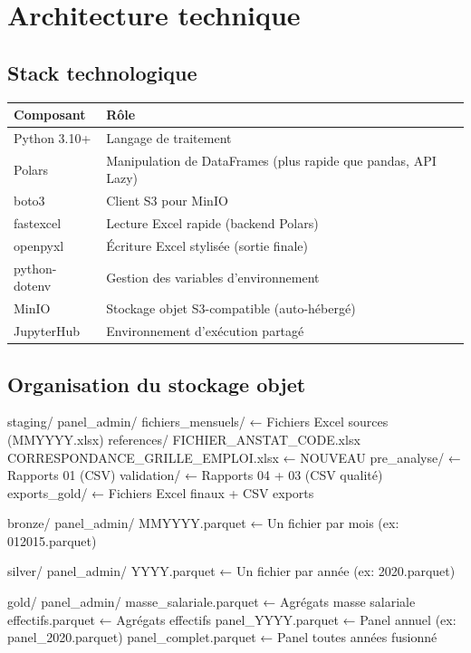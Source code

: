 \documentclass[12pt,a4paper,french]{report}
\begin{document}
\chapter{Architecture technique}

\section{Stack technologique}

\begin{tabularx}{\textwidth}{lX}
  \toprule
  \textbf{Composant} & \textbf{Rôle} \\
  \midrule
  Python 3.10+ & Langage de traitement \\
  Polars & Manipulation de DataFrames (plus rapide que pandas, API Lazy) \\
  boto3 & Client S3 pour MinIO \\
  fastexcel & Lecture Excel rapide (backend Polars) \\
  openpyxl & Écriture Excel stylisée (sortie finale) \\
  python-dotenv & Gestion des variables d'environnement \\
  MinIO & Stockage objet S3-compatible (auto-hébergé) \\
  JupyterHub & Environnement d'exécution partagé \\
  \bottomrule
\end{tabularx}

\section{Organisation du stockage objet}

\begin{codebox}
staging/
  panel\_admin/
    fichiers\_mensuels/       ← Fichiers Excel sources (MMYYYY.xlsx)
    references/
      FICHIER\_ANSTAT\_CODE.xlsx
      CORRESPONDANCE\_GRILLE\_EMPLOI.xlsx   ← NOUVEAU
    pre\_analyse/             ← Rapports 01 (CSV)
    validation/              ← Rapports 04 + 03 (CSV qualité)
    exports\_gold/            ← Fichiers Excel finaux + CSV exports

bronze/
  panel\_admin/
    MMYYYY.parquet            ← Un fichier par mois (ex: 012015.parquet)

silver/
  panel\_admin/
    YYYY.parquet              ← Un fichier par année (ex: 2020.parquet)

gold/
  panel\_admin/
    masse\_salariale.parquet  ← Agrégats masse salariale
    effectifs.parquet         ← Agrégats effectifs
    panel\_YYYY.parquet       ← Panel annuel (ex: panel\_2020.parquet)
    panel\_complet.parquet    ← Panel toutes années fusionné
\end{codebox}
\end{document}
